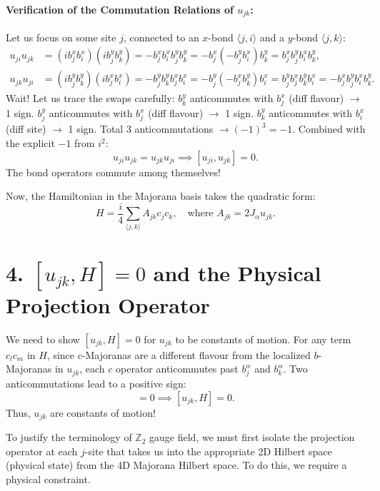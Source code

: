 \documentclass[11pt,a4paper]{article}
\begin{document}
\paragraph{Verification of the Commutation Relations of $u_{jk}$:}
Let us focus on some site $j$, connected to an $x$-bond $\langle j,i \rangle$ and a $y$-bond $\langle j,k \rangle$:
\begin{align}
    u_{ji} u_{jk} &= (i b_j^x b_i^x)(i b_j^y b_k^y) = - b_j^x b_i^x b_j^y b_k^y = - b_j^x (-b_j^y b_i^x) b_k^y = b_j^x b_j^y b_i^x b_k^y, \\
    u_{jk} u_{ji} &= (i b_j^y b_k^y)(i b_j^x b_i^x) = - b_j^y b_k^y b_j^x b_i^x = - b_j^y (-b_j^x b_k^y) b_i^x = b_j^y b_j^x b_k^y b_i^x = - b_j^x b_j^y b_i^x b_k^y.
\end{align}
Wait! Let us trace the swaps carefully:
$b_k^y$ anticommutes with $b_j^x$ (diff flavour) $\to$ 1 sign.
$b_j^y$ anticommutes with $b_j^x$ (diff flavour) $\to$ 1 sign.
$b_k^y$ anticommutes with $b_i^x$ (diff site) $\to$ 1 sign.
Total 3 anticommutations $\to (-1)^3 = -1$.
Combined with the explicit $-1$ from $i^2$:
\begin{equation}
    u_{ji} u_{jk} = u_{jk} u_{ji} \implies [u_{ji}, u_{jk}] = 0.
\end{equation}
The bond operators commute among themselves!

Now, the Hamiltonian in the Majorana basis takes the quadratic form:
\begin{equation}
    H = \frac{i}{4} \sum_{\langle j,k \rangle} A_{jk} c_j c_k, \quad \text{where } A_{jk} = 2 J_\alpha u_{jk}.
\end{equation}


\section*{4. $[u_{jk}, H] = 0$ and the Physical Projection Operator}

We need to show $[u_{jk}, H] = 0$ for $u_{jk}$ to be constants of motion.
For any term $c_l c_m$ in $H$, since $c$-Majoranas are a different flavour from the localized $b$-Majoranas in $u_{jk}$, each $c$ operator anticommutes past $b_j^\alpha$ and $b_k^\alpha$. Two anticommutations lead to a positive sign:
\begin{equation}
    [u_{jk}, c_l c_m] = 0 \implies [u_{jk}, H] = 0.
\end{equation}
Thus, $u_{jk}$ are constants of motion!

To justify the terminology of $\mathbb{Z}_2$ gauge field, we must first isolate the projection operator at each $j$-site that takes us into the appropriate 2D Hilbert space (physical state) from the 4D Majorana Hilbert space. To do this, we require a physical constraint.
\end{document}
